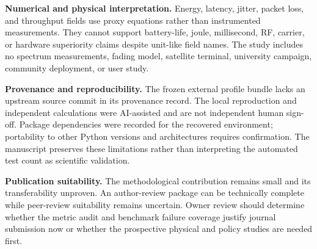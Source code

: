 \textbf{Numerical and physical interpretation.} Energy, latency, jitter, packet loss, and throughput fields use proxy equations rather than instrumented measurements. They cannot support battery-life, joule, millisecond, RF, carrier, or hardware superiority claims despite unit-like field names. The study includes no spectrum measurements, fading model, satellite terminal, university campaign, community deployment, or user study.

\textbf{Provenance and reproducibility.} The frozen external profile bundle lacks an upstream source commit in its provenance record. The local reproduction and independent calculations were AI-assisted and are not independent human sign-off. Package dependencies were recorded for the recovered environment; portability to other Python versions and architectures requires confirmation. The manuscript preserves these limitations rather than interpreting the automated test count as scientific validation.

\textbf{Publication suitability.} The methodological contribution remains small and its transferability unproven. An author-review package can be technically complete while peer-review suitability remains uncertain. Owner review should determine whether the metric audit and benchmark failure coverage justify journal submission now or whether the prospective physical and policy studies are needed first.
